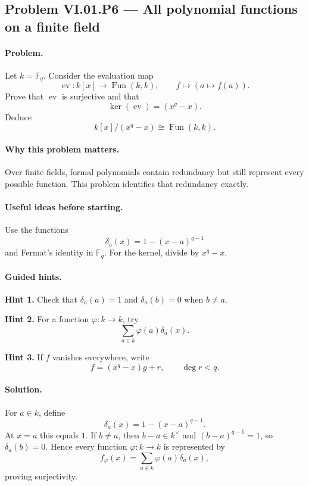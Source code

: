 \subsection*{Problem VI.01.P6 --- All polynomial functions on a finite field}
\label{prob:vi01-p6}

\paragraph{Problem.}
Let \(k=\mathbb F_q\).  Consider the evaluation map
\[
\operatorname{ev}:k[x]\longrightarrow \operatorname{Fun}(k,k),
\qquad
f\longmapsto(a\mapsto f(a)).
\]
Prove that \(\operatorname{ev}\) is surjective and that
\[
\ker(\operatorname{ev})=(x^q-x).
\]
Deduce
\[
k[x]/(x^q-x)\cong\operatorname{Fun}(k,k).
\]

\ifdefined\FullProblemDossiers
\paragraph{Why this problem matters.}
Over finite fields, formal polynomials contain redundancy but still represent every
possible function.  This problem identifies that redundancy exactly.

\paragraph{Useful ideas before starting.}
Use the functions
\[
\delta_a(x)=1-(x-a)^{q-1}
\]
and Fermat's identity in \(\mathbb F_q\).  For the kernel, divide by \(x^q-x\).

\paragraph{Guided hints.}
\textbf{Hint 1.} Check that \(\delta_a(a)=1\) and \(\delta_a(b)=0\) when \(b\neq a\).

\textbf{Hint 2.} For a function \(\varphi:k\to k\), try
\[
\sum_{a\in k}\varphi(a)\delta_a(x).
\]

\textbf{Hint 3.} If \(f\) vanishes everywhere, write
\[
f=(x^q-x)g+r,
\qquad \deg r<q.
\]

\paragraph{Solution.}
For \(a\in k\), define
\[
\delta_a(x)=1-(x-a)^{q-1}.
\]
At \(x=a\) this equals \(1\).  If \(b\neq a\), then \(b-a\in k^\times\) and
\((b-a)^{q-1}=1\), so \(\delta_a(b)=0\).  Hence every function \(\varphi:k\to k\) is
represented by
\[
f_\varphi(x)=\sum_{a\in k}\varphi(a)\delta_a(x),
\]
proving surjectivity.

